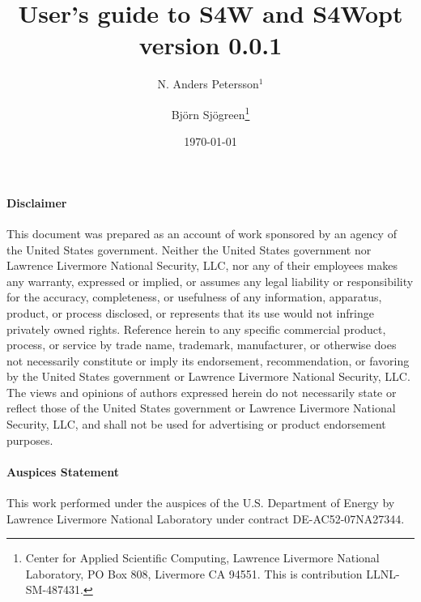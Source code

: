 \documentclass[11pt]{report}
\begin{document}
\title{\Huge User's guide to S4W and S4Wopt version 0.0.1} 

\author{ N. Anders Petersson$^1$ \and Bj\"orn Sj\"ogreen\thanks{Center for Applied Scientific
     Computing, Lawrence Livermore National Laboratory, PO Box 808, Livermore CA 94551. This is
     contribution LLNL-SM-487431.}}
\date{\today} 
\maketitle
\pagestyle{myheadings}


\pagebreak
\paragraph {Disclaimer} 
This document was prepared as an account of work sponsored by an agency of the United States
government. Neither the United States government nor Lawrence Livermore National Security, LLC, nor
any of their employees makes any warranty, expressed or implied, or assumes any legal liability or
responsibility for the accuracy, completeness, or usefulness of any information, apparatus, product,
or process disclosed, or represents that its use would not infringe privately owned
rights. Reference herein to any specific commercial product, process, or service by trade name,
trademark, manufacturer, or otherwise does not necessarily constitute or imply its endorsement,
recommendation, or favoring by the United States government or Lawrence Livermore National Security,
LLC. The views and opinions of authors expressed herein do not necessarily state or reflect those of
the United States government or Lawrence Livermore National Security, LLC, and shall not be used for
advertising or product endorsement purposes. 

\paragraph{Auspices Statement}
This work performed under the auspices of the U.S. Department of Energy by Lawrence Livermore
National Laboratory under contract DE-AC52-07NA27344.
\tableofcontents

\end{document}

